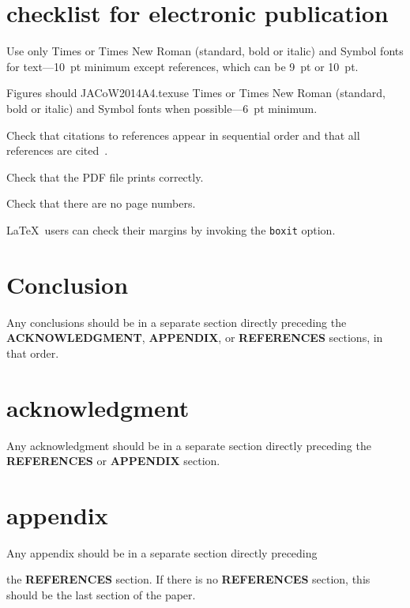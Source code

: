 \documentclass[a4paper,
              ]{jacow}
\newcommand\SEC[1]{\textbf{\uppercase{#1}}}
\begin{document}
\section{checklist for electronic publication}

\begin{Itemize}
    \item  Use only Times or Times New Roman (standard, bold or italic) and Symbol
           fonts for text---\SI{10}{pt} minimum except references, which can be \SI{9}{pt} or \SI{10}{pt}.
    \item  Figures should JACoW2014A4.texuse Times or Times New Roman (standard, bold or italic) and
           Symbol fonts when possible---\SI{6}{pt} minimum.
    \item  Check that citations to references appear in sequential order and
           that all references are cited~\cite{exampl-last}.
    \item  Check that the PDF file prints correctly.
    \item  Check that there are no page numbers.
    \item  \LaTeX\ users can check their margins by invoking the
           \texttt{boxit} option.
\end{Itemize}

\section{Conclusion}

Any conclusions should be in a separate section directly preceding
the \SEC{Acknowledgment}, \SEC{Appendix}, or \SEC{References} sections, in that
order.

\section{acknowledgment}
Any acknowledgment should be in a separate section directly preceding
the \SEC{References} or \SEC{Appendix} section.

%
%
\iftrue   %
	\newpage
	\raggedend
\fi

\section{appendix}
Any appendix should be in a separate section directly preceding

the \SEC{References} section. If there is no \SEC{References} section,
this should be the last section of the paper.
\end{document}
